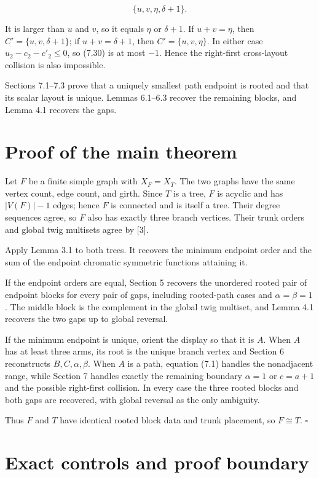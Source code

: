 \documentclass[11pt]{article}
\begin{document}
\begin{equation*}
\{u,v,\eta,\delta+1\}.
\end{equation*}


It is larger than $u$ and $v$, so it equals $\eta$ or $\delta+1$. If $u+v=\eta$, then
$C'=\{u,v,\delta+1\}$; if $u+v=\delta+1$, then $C'=\{u,v,\eta\}$. In either case
$u_2-c_2-c'_2\leq0$, so (7.30) is at most $-1$. Hence the right-first cross-layout collision is
also impossible.

Sections 7.1--7.3 prove that a uniquely smallest path endpoint is rooted and that its scalar layout
is unique. Lemmas 6.1--6.3 recover the remaining blocks, and Lemma 4.1 recovers the gaps.

\section{Proof of the main theorem}


Let $F$ be a finite simple graph with $X_F=X_T$. The two graphs have the same vertex count, edge
count, and girth. Since $T$ is a tree, $F$ is acyclic and has $|V(F)|-1$ edges; hence $F$ is
connected and is itself a tree. Their degree sequences agree, so $F$ also has exactly three branch
vertices. Their trunk orders and global twig multisets agree by [3].

Apply Lemma 3.1 to both trees. It recovers the minimum endpoint order and the sum of the endpoint
chromatic symmetric functions attaining it.

If the endpoint orders are equal, Section 5 recovers the unordered rooted pair of endpoint blocks
for every pair of gaps, including rooted-path cases and $\alpha=\beta=1$. The middle block is the
complement in the global twig multiset, and Lemma 4.1 recovers the two gaps up to global reversal.

If the minimum endpoint is unique, orient the display so that it is $A$. When $A$ has at least three
arms, its root is the unique branch vertex and Section 6 reconstructs $B,C,\alpha,\beta$. When $A$
is a path, equation (7.1) handles the nonadjacent range, while Section 7 handles exactly the
remaining boundary $\alpha=1$ or $c=a+1$ and the possible right-first collision. In every case the
three rooted blocks and both gaps are recovered, with global reversal as the only ambiguity.

Thus $F$ and $T$ have identical rooted block data and trunk placement, so $F\cong T$. $\square$

\section{Exact controls and proof boundary}
\end{document}
